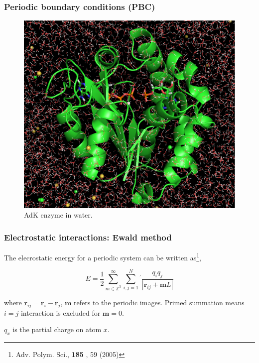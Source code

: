 \documentclass{beamer}
\begin{document}
\begin{frame}\frametitle{Periodic boundary conditions (PBC)}

\begin{figure}
\includegraphics[scale=0.135]{protein_water_ligand_ions.eps}
\caption{{\scriptsize  AdK enzyme in water.}}
\end{figure}

\end{frame}


\begin{frame}\frametitle{Electrostatic interactions: Ewald method}

The elecrostatic energy for a periodic system can be written as\footnote{{\scriptsize Adv. Polym. Sci.,  {\bf
185 }, 59 (2005)}},

\begin{equation}
	E= \frac{1}{2} \sum_{m \in \mathbb{Z}^3}^{\infty} \sum_{i,j=1}^{N}{}^{'} \frac{q_i q_j}{ |\mathbf{r}_{ij} + \mathbf{m}L| }
\end{equation}

where $\mathbf{r}_{ij} = \mathbf{r}_i -   \mathbf{r}_j$, $\mathbf{m}$ refers to the periodic 
images. Primed summation means $i=j$ interaction is excluded for $\mathbf{m}=0$.

$q_x$ is the partial charge on atom $x$.

%
%
%

\end{frame}
\end{document}
